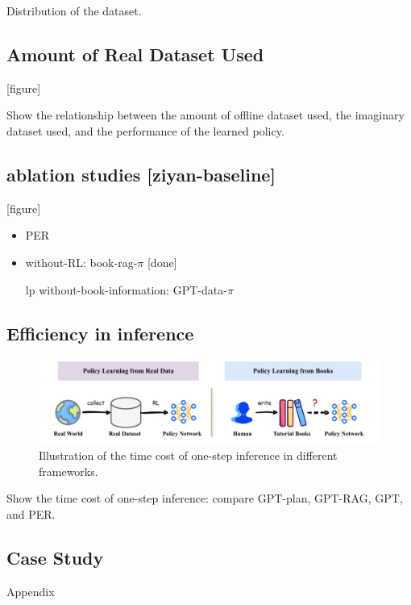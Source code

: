 Distribution of the dataset.

\subsection{Amount of Real Dataset Used}

[figure]

Show the relationship between the amount of offline dataset used, the imaginary dataset used, and the performance of the learned policy.

\subsection{ablation studies [ziyan-baseline]}

[figure]

\begin{itemize}
    \item PER
    \item without-RL: book-rag-$\pi$ [done]
    \item [lp]  without-book-information: GPT-data-$\pi$
\end{itemize}

\subsection{Efficiency in inference} 

\begin{figure}[ht]
\centering
\includegraphics[width=0.75\linewidth]{fig/PER-problem.pdf}
\caption{Illustration of the time cost of one-step inference in different frameworks.}
\label{fig:code_aggregation}
\end{figure}

Show the time cost of one-step inference: compare GPT-plan, GPT-RAG, GPT, and PER.


\subsection{Case Study}
Appendix


